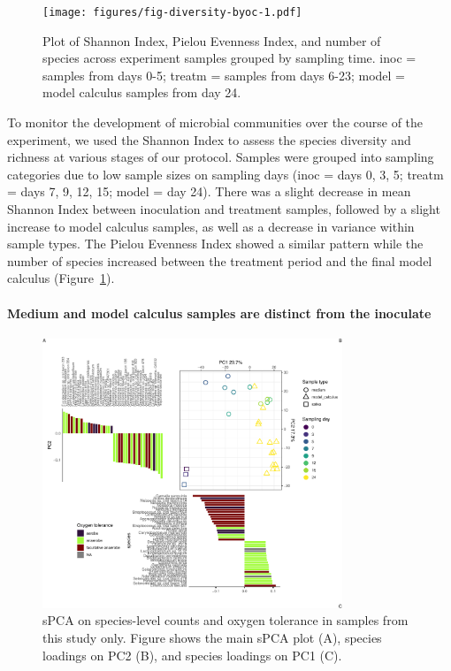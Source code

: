 \documentclass[10pt,a4paper]{article}
\begin{document}
\begin{figure}
    \centering
    \texttt{[image: figures/fig-diversity-byoc-1.pdf]}
    \caption{\label{fig-diversity-byoc}Plot of Shannon Index, Pielou
Evenness Index, and number of species across experiment samples grouped
by sampling time. inoc = samples from days 0-5; treatm = samples from
days 6-23; model = model calculus samples from day 24.}
\end{figure}

To monitor the development of microbial communities over the course of
the experiment, we used the Shannon Index to assess the species
diversity and richness at various stages of our protocol. Samples were
grouped into sampling categories due to low sample sizes on sampling
days (inoc = days 0, 3, 5; treatm = days 7, 9, 12, 15; model = day 24).
There was a slight decrease in mean Shannon Index between inoculation
and treatment samples, followed by a slight increase to model calculus
samples, as well as a decrease in variance within sample types. The
Pielou Evenness Index showed a similar pattern while the number of
species increased between the treatment period and the final model
calculus (Figure~\ref{fig-diversity-byoc}).

\paragraph{Medium and model calculus samples are distinct from the
inoculate}\label{medium-and-model-calculus-samples-are-distinct-from-the-inoculate}

\begin{figure}
    \centering
    \includegraphics[width=0.8\textwidth]{figures/fig-spca-byoc-1.pdf}
    \caption{\label{fig-spca-byoc}sPCA on species-level counts and oxygen
tolerance in samples from this study only. Figure shows the main sPCA
plot (A), species loadings on PC2 (B), and species loadings on PC1 (C).}
\end{figure}
\end{document}
